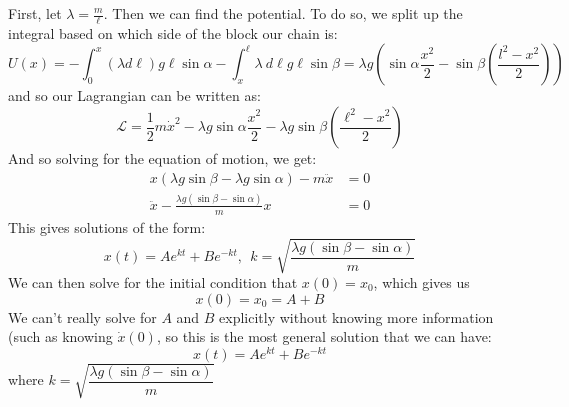 \documentclass[10pt]{article}
\begin{document}
	\begin{solution}
			First, let $\lambda = \frac{m}{\ell}$. Then we can find the potential. To do so, we split up the 
			integral based on which side of the block our chain is:
			\[ U(x) = -\int_0^x (\lambda d\ell) g\ell \sin \alpha - 
			\int_x^\ell \lambda \ d\ell g \ell \sin \beta = \lambda g \left( \sin \alpha \frac{x^2}{2} - 
			\sin \beta \left( \frac{l^2 -x^2}{2}\right)\right)\]
			and so our Lagrangian can be written as:
			\[ \mathcal L = \frac{1}{2}m\dot x^2 - \lambda g \sin \alpha \frac{x^2}{2} - \lambda g \sin \beta 
			\left(\frac{\ell^2-x^2}{2}\right)\]
			And so solving for the equation of motion, we get: 
			\begin{align*}
					x(\lambda g\sin \beta - \lambda g \sin \alpha) - m\ddot x &= 0\\
					\ddot x - \frac{\lambda g(\sin \beta - \sin \alpha)}{m}x &= 0
			\end{align*}
			This gives solutions of the form: 
			\[x(t) = Ae^{kt} + Be^{-kt}, \ \ k = \sqrt{\frac{\lambda g(\sin \beta - \sin \alpha)}{m}} \]
			We can then solve for the initial condition that $x(0) = x_0$, which gives us
			\[ x(0) = x_0 = A + B\]
			We can't really solve for $A$ and $B$ explicitly without knowing more information (such as 
			knowing $\dot x(0)$, so this is the most general solution that we can have: 
			\[ x(t) = Ae^{kt}+ Be^{-kt}\]
			where $k = \sqrt{\dfrac{\lambda g(\sin \beta - \sin \alpha)}{m}}$
	\end{solution}	




	

	
\end{document}
